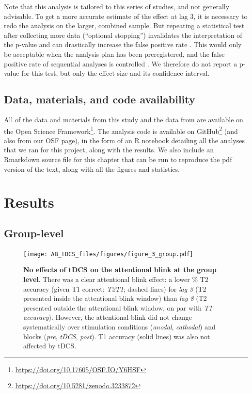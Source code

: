 \documentclass[11pt,]{memoir}
\let\rmarkdownfootnote\footnote%
\def\footnote{\protect\rmarkdownfootnote}
\renewcommand{\href}[2]{#2\footnote{\url{#1}}} %
\begin{document}
Note that this analysis is tailored to this series of studies, and not generally advisable. To get a more accurate estimate of the effect at lag 3, it is necessary to redo the analysis on the larger, combined sample. But repeating a statistical test after collecting more data (``optional stopping'') invalidates the interpretation of the p-value and can drastically increase the false positive rate \autocite{Simmons2011}. This would only be acceptable when the analysis plan has been preregistered, and the false positive rate of sequential analyses is controlled \autocite[for potential solutions, see][]{Lakens2014}. We therefore do not report a p-value for this test, but only the effect size and its confidence interval.

\hypertarget{data-materials-and-code-availability-1}{%
\subsection{Data, materials, and code availability}\label{data-materials-and-code-availability-1}}

All of the data and materials from this study and the data from \textcite{London2015} are available on the \href{https://doi.org/10.17605/OSF.IO/Y6HSF}{Open Science Framework}. The analysis code is available on \href{https://doi.org/10.5281/zenodo.3233872}{GitHub} (and also from our OSF page), in the form of an R notebook detailing all the analyses that we ran for this project, along with the results. We also include an Rmarkdown \autocite{Xie2018} source file for this chapter that can be run to reproduce the pdf version of the text, along with all the figures and statistics.

\hypertarget{AB_tDCS-results}{%
\section{Results}\label{AB_tDCS-results}}

\hypertarget{group-level}{%
\subsection{Group-level}\label{group-level}}

\begin{figure}
\centering
\texttt{[image: AB\_tDCS\_files/figures/figure\_3\_group.pdf]}
\caption{\label{fig:fig-group}\textbf{No effects of tDCS on the attentional blink at the group level}. There was a clear attentional blink effect: a lower \% T2 accuracy (given T1 correct: \emph{T2\textbar{}T1}; dashed lines) for \emph{lag 3} (T2 presented inside the attentional blink window) than \emph{lag 8} (T2 presented outside the attentional blink window, on par with \emph{T1 accuracy}). However, the attentional blink did not change systematically over stimulation conditions (\emph{anodal}, \emph{cathodal}) and blocks (\emph{pre}, \emph{tDCS}, \emph{post}). T1 accuracy (solid lines) was also not affected by tDCS.}
\end{figure}
\end{document}
